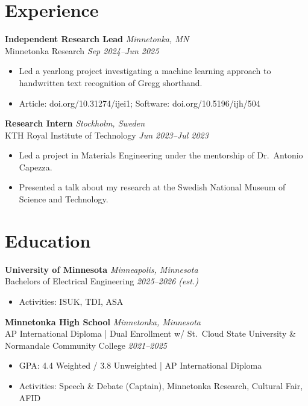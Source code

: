 \documentclass{article}
\begin{document}
\section{Experience}

\textbf{Independent Research Lead} \hfill \textit{Minnetonka, MN}\\
Minnetonka Research \hfill \textit{Sep 2024--Jun 2025}
\begin{itemize}
\item Led a yearlong project investigating a machine learning approach to handwritten text recognition of Gregg shorthand.
\item \textcolor{linkcolor}{Article: doi.org/10.31274/ijei1}; \textcolor{linkcolor}{Software: doi.org/10.5196/ijh/504}
\end{itemize}

\textbf{Research Intern} \hfill \textit{Stockholm, Sweden}\\
KTH Royal Institute of Technology \hfill \textit{Jun 2023--Jul 2023}
\begin{itemize}
\item Led a project in Materials Engineering under the mentorship of Dr.\ Antonio Capezza.
\item Presented a talk about my research at the Swedish National Museum of Science and Technology.
\end{itemize}

\section{Education}

\textbf{University of Minnesota} \hfill \textit{Minneapolis, Minnesota}\\
Bachelors of Electrical Engineering \hfill \textit{2025--2026 (est.)}
\begin{itemize}
\item Activities: ISUK, TDI, ASA
\end{itemize}

\textbf{Minnetonka High School} \hfill \textit{Minnetonka, Minnesota}\\
AP International Diploma | Dual Enrollment w/ St.\ Cloud State University \& Normandale Community College \hfill \textit{2021--2025}
\begin{itemize}
\item GPA\@: 4.4 Weighted / 3.8 Unweighted | AP International Diploma
\item Activities: Speech \& Debate (Captain), Minnetonka Research, Cultural Fair, AFID
\end{itemize}
\end{document}
